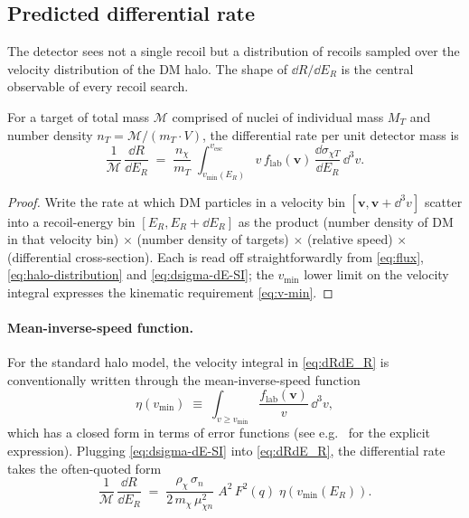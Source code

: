 \subsection{Predicted differential rate}
\label{sec:recoil-rate}

\begin{phenomenon}
The detector sees not a single recoil but a distribution of recoils
sampled over the velocity distribution of the DM halo. The shape
of $\dd R/\dd E_R$ is the central observable of every recoil
search.
\end{phenomenon}

\begin{statement}
\label{stmt:dRdE}
For a target of total mass $\mathcal M$ comprised of nuclei of
individual mass $M_T$ and number density $n_T=\mathcal M/(m_T \cdot V)$,
the differential rate per unit detector mass is
\begin{equation}
\label{eq:dRdE_R}
\frac{1}{\mathcal M}\,\frac{\dd R}{\dd E_R}
\;=\; \frac{n_\chi}{m_T}\;\int_{v_\text{min}(E_R)}^{v_\text{esc}}\!\!
v\,f_\text{lab}(\bm v)\,\frac{\dd\sigma_{\chi T}}{\dd E_R}\,\dd^3v.
\end{equation}
\end{statement}

\begin{proof}
Write the rate at which DM particles in a velocity bin
$[\bm v,\bm v+\dd^3 v]$ scatter into a recoil-energy bin
$[E_R,E_R+\dd E_R]$ as the product (number density of DM in that
velocity bin) $\times$ (number density of targets) $\times$
(relative speed) $\times$ (differential cross-section). Each is
read off straightforwardly from \cref{eq:flux},
\cref{eq:halo-distribution} and \cref{eq:dsigma-dE-SI}; the
$v_\text{min}$ lower limit on the velocity integral expresses the
kinematic requirement \cref{eq:v-min}.
\end{proof}

\paragraph{Mean-inverse-speed function.}
For the standard halo model, the velocity integral in
\cref{eq:dRdE_R} is conventionally written through the
mean-inverse-speed function
\begin{equation}
\label{eq:eta}
\eta(v_\text{min}) \;\equiv\; \int_{v\geq v_\text{min}}\frac{f_\text{lab}(\bm v)}{v}\,\dd^3v,
\end{equation}
which has a closed form in terms of error functions (see
e.g.~\cite{lewin1996} for the explicit expression). Plugging
\cref{eq:dsigma-dE-SI} into \cref{eq:dRdE_R}, the differential rate
takes the often-quoted form
\begin{equation}
\label{eq:dRdE-final}
\frac{1}{\mathcal M}\,\frac{\dd R}{\dd E_R}
\;=\; \frac{\rho_\chi\,\sigma_n}{2\,m_\chi\,\mu_{\chi n}^2}\;A^2\,F^2(q)\;\eta(v_\text{min}(E_R)).
\end{equation}


